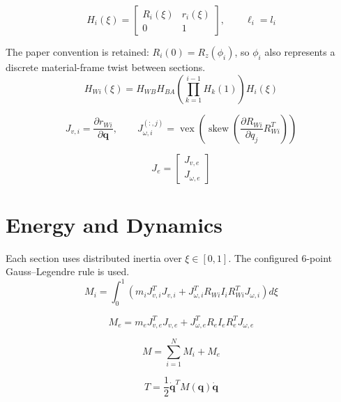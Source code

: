\documentclass[11pt]{article}
\begin{document}
\begin{equation}
H_i(\xi)=\begin{bmatrix}R_i(\xi)&r_i(\xi)\\0&1\end{bmatrix},\qquad \ell_i=l_i\label{eq:local-transform}
\end{equation}

The paper convention is retained: $R_i(0)=R_z(\phi_i)$, so $\phi_i$ also represents a discrete material-frame twist between sections.
\begin{equation}
H_{Wi}(\xi)=H_{WB}H_{BA}\left(\prod_{k=1}^{i-1}H_k(1)\right)H_i(\xi)
\end{equation}

\begin{equation}
J_{v,i}=\frac{\partial r_{Wi}}{\partial\boldsymbol q},\qquad J_{\omega,i}^{(:,j)}=\operatorname{vex}\!\left(\operatorname{skew}\!\left(\frac{\partial R_{Wi}}{\partial q_j}R_{Wi}^{T}\right)\right)
\end{equation}

\begin{equation}
J_e=\begin{bmatrix}J_{v,e}\\J_{\omega,e}\end{bmatrix}
\end{equation}


\section{Energy and Dynamics}
Each section uses distributed inertia over $\xi\in[0,1]$. The configured 6-point Gauss--Legendre rule is used.
\begin{equation}
M_i=\int_0^1\!\left(m_iJ_{v,i}^{T}J_{v,i}+J_{\omega,i}^{T}R_{Wi}I_iR_{Wi}^{T}J_{\omega,i}\right)d\xi
\end{equation}

\begin{equation}
M_e=m_eJ_{v,e}^{T}J_{v,e}+J_{\omega,e}^{T}R_eI_eR_e^TJ_{\omega,e}
\end{equation}

\begin{equation}
M=\sum_{i=1}^{N}M_i+M_e\label{eq:mass-assembly}
\end{equation}

\begin{equation}
T=\frac12\dot{\boldsymbol q}^{T}M(\boldsymbol q)\dot{\boldsymbol q}
\end{equation}
\end{document}
